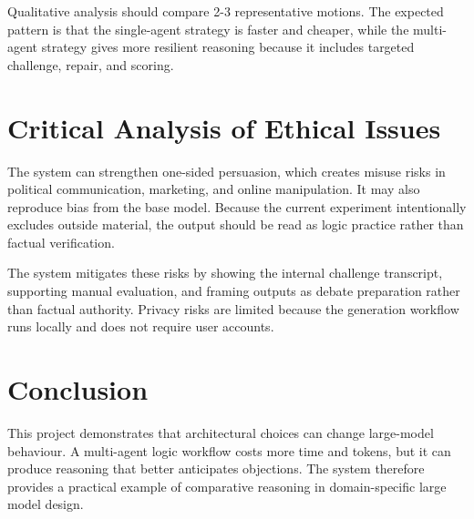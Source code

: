 \documentclass[11pt]{article}
\begin{document}
Qualitative analysis should compare 2-3 representative motions. The expected pattern is that the single-agent strategy is faster and cheaper, while the multi-agent strategy gives more resilient reasoning because it includes targeted challenge, repair, and scoring.

\section{Critical Analysis of Ethical Issues}
The system can strengthen one-sided persuasion, which creates misuse risks in political communication, marketing, and online manipulation. It may also reproduce bias from the base model. Because the current experiment intentionally excludes outside material, the output should be read as logic practice rather than factual verification.

The system mitigates these risks by showing the internal challenge transcript, supporting manual evaluation, and framing outputs as debate preparation rather than factual authority. Privacy risks are limited because the generation workflow runs locally and does not require user accounts.

\section{Conclusion}
This project demonstrates that architectural choices can change large-model behaviour. A multi-agent logic workflow costs more time and tokens, but it can produce reasoning that better anticipates objections. The system therefore provides a practical example of comparative reasoning in domain-specific large model design.
\end{document}
